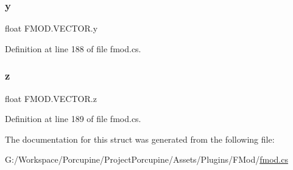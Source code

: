 \subsubsection{\texorpdfstring{y}{y}}
{\footnotesize\ttfamily float F\+M\+O\+D.\+V\+E\+C\+T\+O\+R.\+y}



Definition at line 188 of file fmod.\+cs.

\mbox{\label{struct_f_m_o_d_1_1_v_e_c_t_o_r_adbde8f01955fb7b1dcba6f11a067e3d2}} 
\subsubsection{\texorpdfstring{z}{z}}
{\footnotesize\ttfamily float F\+M\+O\+D.\+V\+E\+C\+T\+O\+R.\+z}



Definition at line 189 of file fmod.\+cs.



The documentation for this struct was generated from the following file\+:\begin{DoxyCompactItemize}
\item 
G\+:/\+Workspace/\+Porcupine/\+Project\+Porcupine/\+Assets/\+Plugins/\+F\+Mod/\hyperlink{fmod_8cs}{fmod.\+cs}\end{DoxyCompactItemize}
